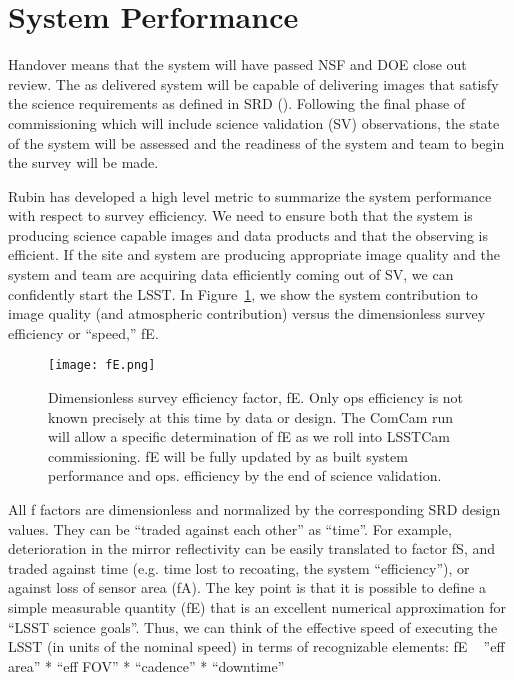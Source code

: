 \section{System Performance}
  
Handover means that the system will have passed NSF and DOE close out review. The as delivered system will be capable of delivering images that satisfy the science requirements as defined in SRD (\cite{LPM-17}). Following the final phase of commissioning which will include science validation (SV) observations, the state of the system will be assessed and the readiness of the system and team to begin the survey will be made. 

Rubin has developed a high level metric to summarize the system performance with respect to survey efficiency. We need to ensure both that the system is producing science capable images and data products and that the observing is efficient. 
If the site and system are producing appropriate image quality and the system and team are acquiring data efficiently coming out of SV, we can confidently start the LSST. In Figure~\ref{fE}, we show the system contribution to image quality (and atmospheric contribution) versus the dimensionless survey efficiency or ``speed,'' fE. 

\begin{figure}%
  \centering
\texttt{[image: fE.png]}
\caption{Dimensionless survey efficiency factor, fE. Only ops efficiency is not known precisely at this time by data or design. The ComCam run will allow a specific determination of fE as we roll into LSSTCam commissioning. fE will be fully updated by as built system performance and ops. efficiency by the end of science validation.}
\label{fE}
\end{figure}

All f factors are dimensionless and normalized by the corresponding SRD design values. They can be “traded against each other” as “time”.
For example, deterioration in the mirror reflectivity can be easily translated to factor fS, and traded against time (e.g. time lost to recoating, the system “efficiency”), or against loss of sensor area (fA).
The key point is that it is possible to define a simple measurable quantity (fE) that is an excellent numerical approximation for “LSST science goals”. Thus, we can think of the effective speed of executing the LSST (in units of the nominal speed) in terms of recognizable elements: fE ~ ”eff area” * “eff FOV” * “cadence” * “downtime”

